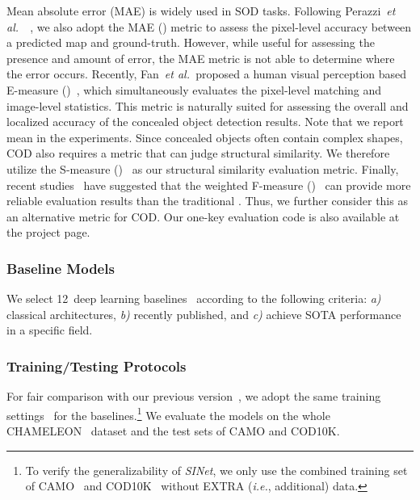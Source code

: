 \documentclass[10pt,journal,compsoc]{IEEEtran}
\def\ie{\emph{i.e.}}
\def\etal{{\em et al.~}}
\def\ournewmodel{\emph{SINet}}
\def\baselineN{12}
\begin{document}
Mean absolute error (MAE) is widely used in SOD tasks.
Following Perazzi~\etal~\cite{perazzi2012saliency}, 
we also adopt the MAE () metric to assess the pixel-level accuracy 
between a predicted map and ground-truth.
However, while useful for assessing the presence and amount of error, 
the MAE metric is not able to determine where the error occurs.
Recently, Fan~\etal proposed a human visual perception based 
E-measure ()~\cite{Fan2018Enhanced}, 
which simultaneously evaluates the pixel-level matching and 
image-level statistics.
This metric is naturally suited for assessing the overall and
localized accuracy of the concealed object detection results.
Note that we report mean  in the experiments.
Since concealed objects often contain complex shapes, 
COD also requires a metric that can judge structural similarity.
We therefore utilize the S-measure ()~\cite{fan2017structure}
as our structural similarity evaluation metric.
Finally, recent studies~\cite{Fan2018Enhanced,fan2017structure} have suggested 
that the weighted F-measure ()~\cite{margolin2014evaluate} 
can provide more reliable evaluation results than the traditional .
Thus, we further consider this as an alternative metric for COD.
Our one-key evaluation code is also available at the project page.


\subsubsection{Baseline Models}


We select \baselineN~deep learning baselines~\cite{lin2017feature,he2017mask,
zhao2017pyramid,zou2018DLMIA,liu2018picanet,huang2019mask,zhao2019pyramid,
wu2019cascaded,chen2019hybrid,zhao2019EGNet,le2019anabranch,fan2020pranet} according to the following criteria:
\textit{a)} classical architectures,
\textit{b)} recently published, and
\textit{c)} achieve SOTA performance in a specific field.


\subsubsection{Training/Testing Protocols}
For fair comparison with our previous version~\cite{fan2020camouflaged},
we adopt the same training settings~\cite{fan2020camouflaged} for the baselines.\footnote{To verify the generalizability of \ournewmodel, we only use the combined training set of CAMO~\cite{le2019anabranch} and 
COD10K~\cite{fan2020camouflaged} without EXTRA (\ie, additional) data.}
We evaluate the models on the whole CHAMELEON~\cite{2018Animal} dataset 
and the test sets of CAMO and COD10K.
\end{document}
